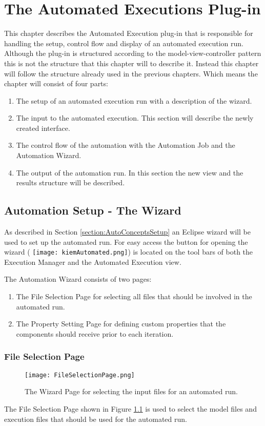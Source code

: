 \chapter{The Automated Executions Plug-in}
This chapter describes the Automated Execution plug-in that is responsible for handling
the setup, control flow and display of an automated execution run.
Although the plug-in is structured according to the model-view-controller pattern this
is not the structure that this chapter will to describe it. Instead this chapter will
follow the structure already used in the previous chapters. Which means the chapter will
consist of four parts:
\begin{enumerate}
 \item The setup of an automated execution run with a description of the wizard.
 \item The input to the automated execution. This section will describe the newly created interface.
 \item The control flow of the automation with the Automation Job and the Automation Wizard.
 \item The output of the automation run. In this section the new view and the results structure will
be described.
\end{enumerate}


\section{Automation Setup - The Wizard}
\label{section:AutoWizard}
As described in Section \ref{section:AutoConceptsSetup} an Eclipse wizard will be used to set up the 
automated run. For easy access the button for opening the wizard (
\texttt{[image: kiemAutomated.png]})
is located on the tool bars of both the Execution Manager and the Automated Execution view.

The Automation Wizard consists of two pages:
\begin{enumerate}
 \item The File Selection Page for selecting all files that should be involved in the automated run.
 \item The Property Setting Page for defining custom properties that the components should receive prior to
each iteration.
\end{enumerate}


\subsection{File Selection Page}
\label{section:FileSelectionPage}
\begin{figure}
  \centering
  \texttt{[image: FileSelectionPage.png]}
  \caption[The Wizard Page for selecting the input files for an automated run.]%
  {The Wizard Page for selecting the input files for an automated run.\protect}
  \label{fig:FileSelectionPage}
\end{figure}
The File Selection Page shown in Figure \ref{fig:FileSelectionPage} is used to select the model 
files and execution files that should be used for the automated run.

